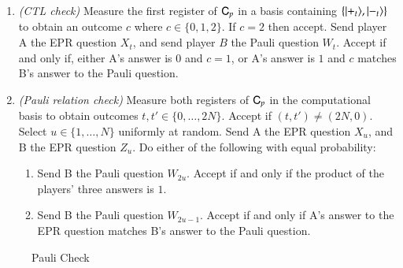 \begin{center}
\begin{mdframed}
\begin{enumerate}
\item \emph{(CTL check)} Measure the first register of ${\textsf{C}}_{p}$ in a basis containing $\{|+_t\rangle,|-_t\rangle\}$ to obtain an outcome $c$ where $c\in\{0,1,2\}$. If $c=2$ then accept. Send player A the EPR question $X_{t}$, and send player $B$ the Pauli question $W_t$. Accept if and only if, either A's answer is $0$ and $c=1$, or A's answer is $1$ and $c$ matches B's answer to the Pauli question. %

\item{\emph{(Pauli relation check)}} Measure both  registers of ${\textsf{C}}_p$  in the computational basis to obtain outcomes $t,t'\in\{0,\ldots,2N\}$. Accept if $(t,t')\neq (2N,0)$. Select $u\in\{1,\ldots,N\}$ uniformly at random. Send A the EPR question $X_u$, and B the EPR question $Z_u$. Do either of the following with equal probability:
\begin{enumerate}
\item Send B the Pauli question $W_{2u}$. Accept if and only if the product of the players' three answers is $1$.
\item Send B the Pauli question $W_{2u-1}$. Accept if and only if A's answer to the EPR question matches B's answer to the Pauli question. 
\end{enumerate}  
\end{enumerate}  
\end{mdframed}
\end{center}
\begin{figure}[H]
\caption{Pauli Check}
\label{fig:pauli_check}
\end{figure}



